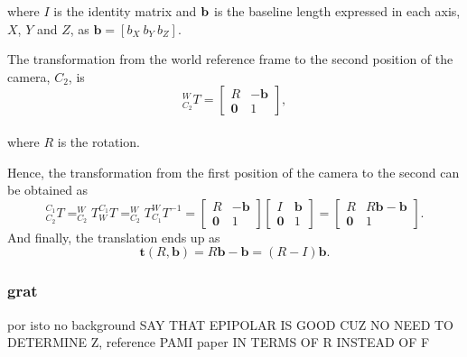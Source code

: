 where $I$ is the identity matrix and $\bf b$ is the baseline length expressed in each axis, $X$, $Y$ and $Z$, as $\mathbf{b} = [b_X \ b_Y \ b_Z]$. 

The transformation from the world reference frame to the second position of the camera, ${C_2}$, is
\begin{equation}
^W_{C_2}T = \begin{bmatrix}
R & -\mathbf{b}\\ 
\mathbf{0} & 1
\end{bmatrix},
\end{equation}\\
where $R$ is the rotation.

Hence, the transformation from the first position of the camera to the second can be obtained as
\begin{equation}
^{C_1}_{C_2}T = ^{W}_{C_2}T ^{C_1}_{W}T = ^{W}_{C_2}T ^{W}_{C_1}T^{-1} = 
\begin{bmatrix}
R & -\mathbf{b}\\ 
\mathbf{0} & 1
\end{bmatrix}
\begin{bmatrix}
I & \mathbf{b}\\ 
\mathbf{0} & 1
\end{bmatrix}
=
\begin{bmatrix}
R & R\mathbf{b}-\mathbf{b}\\ 
\mathbf{0} & 1
\end{bmatrix}.
\end{equation}
And finally, the translation ends up as
\begin{equation}
\mathbf{t}(R, \mathbf{b}) = R\mathbf{b}-\mathbf{b} = (R-I)\mathbf{b}.
\end{equation}


\subsubsection{\acrlong{grat}}

por isto no background
SAY THAT EPIPOLAR IS GOOD CUZ NO NEED TO DETERMINE Z, reference PAMI paper
IN TERMS OF R INSTEAD OF F
